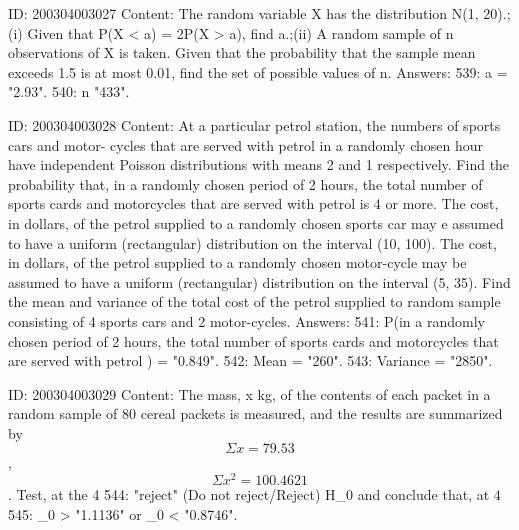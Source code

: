 \documentclass{article}
\begin{document}
ID: 200304003027
Content:
The random variable X has the distribution N(1, 20).;(i) Given that P(X < a) = 2P(X > a), find a.;(ii) A random sample of n observations of X is taken. Given that the probability that the sample mean exceeds 1.5 is at most 0.01, find the set of possible values of n. Answers:
539: a = "2.93".
540: n \geq "433".

ID: 200304003028
Content:
At a particular petrol station, the numbers of sports cars and motor- cycles that are served with petrol in a randomly chosen hour have independent Poisson distributions with means 2 and 1 respectively. Find the probability that, in a randomly chosen period of 2 hours, the total number of sports cards and motorcycles that are served with petrol is 4 or more.  The cost, in dollars, of the petrol supplied to a randomly chosen sports car may e assumed to have a uniform (rectangular) distribution on the interval (10, 100). The cost, in dollars, of the petrol supplied to a randomly chosen motor-cycle may be assumed to have a uniform (rectangular) distribution on the interval (5, 35). Find the mean and variance of the total cost of the petrol supplied to random sample consisting of 4 sports cars and 2 motor-cycles. Answers:
541: P(in a randomly chosen period of 2 hours, the total number of sports cards and motorcycles that are served with petrol ) = "0.849".
542: Mean = "260".
543: Variance = "2850".

ID: 200304003029
Content:
The mass, x kg, of the contents of each packet in a random sample of 80 cereal packets is measured, and the results are summarized by $$\Sigma x=79.53$$, $$\Sigma x^2 = 100.4621$$. Test, at the 4%
544: "reject" (Do not reject/Reject) H_0 and conclude that, at 4%
545: \mu_0 > "1.1136" or \mu_0 < "0.8746".
\end{document}
